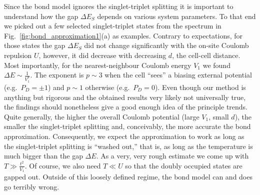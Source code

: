 Since the bond model ignores the singlet-triplet splitting it is important to
understand how the gap $\Delta E_S$ depends on various system parameters. To
that end we picked out a few selected singlet-triplet states from the spectrum
in Fig.~\ref{fig:bond_approximation1}(a) as examples. Contrary to expectations,
for those states the gap $\Delta E_S$ did not change significantly with the
on-site Coulomb repulsion $U$, however, it did decrease with decreasing $d$, the
cell-cell distance. Most importantly, for the nearest-neighbour Coulomb energy
$V_1$ we found $\Delta E \sim \frac{1}{V_1^p}$. The exponent is $p \sim 3$ when
the cell ``sees'' a biasing external potential (e.g.\ $P_D = \pm 1$) and $p \sim
1$ otherwise (e.g.\ $P_D = 0$). Even though our method is anything but rigorous
and the obtained results very likely not universally true, the findings should
nonetheless give a good enough idea of the principle trends. Quite generally,
the higher the overall Coulomb potential (large $V_1$, small $d$), the smaller
the singlet-triplet splitting and, conceivably, the more accurate the bond
approximation. Consequently, we expect the approximation to work as long as the
singlet-triplet splitting is ``washed out,'' that is, as long as the temperature
is much bigger than the gap $\Delta E$. As a very, very rough estimate we come
up with $T \gg \frac{t^2}{V_1}$. Of course, we also need $T \ll U$ so that the
doubly occupied states are gapped out. Outside of this loosely defined regime,
the bond model can and does go terribly wrong.

